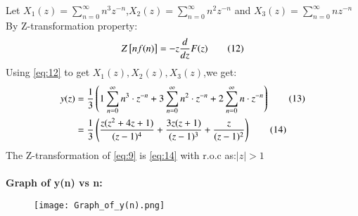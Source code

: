 \documentclass[journal,12pt,twocolumn]{IEEEtran}
\theoremstyle{remark}
\begin{document}
Let $X_1(z)=\sum_{n=0}^{\infty}n^3 z^{-n}$,$X_2(z)=\sum_{n=0}^{\infty}n^2z^{-n}$ and $X_3(z)=\sum_{n=0}^{\infty}nz^{-n}$\\
By Z-transformation property:
\begin{align}
Z{}\left[nf(n)\right]=-z\frac{d}{dz}F(z)\label{eq:12}\tag{12}
\end{align}
Using \eqref{eq:12} to get $X_1(z),X_2(z),X_3(z)$,we get:
\begin{align}
    y(z)&=\frac{1}{3} \left(1 \sum_{n=0}^{\infty} n^3 \cdot z^{-n} + 3 \sum_{n=0}^{\infty} n^2 \cdot z^{-n} + 2 \sum_{n=0}^{\infty} n \cdot z^{-n}\right) \label{eq:13}\tag{13}\\
    &=\frac{1}{3} \left(\frac{z(z^2+4z+1)}{(z-1)^4} + \frac{3z(z+1)}{(z-1)^3} + \frac{z}{(z-1)^2}\right) \label{eq:14}\tag{14}
\end{align}
The Z-transformation of \eqref{eq:9} is \eqref{eq:14} with r.o.c as:$|z|>1$\\ \\
\textbf{Graph of y(n) vs n:}
\begin{figure}[h]
        \centering
\texttt{[image: Graph\_of\_y(n).png]}
    \end{figure}
\end{document}

